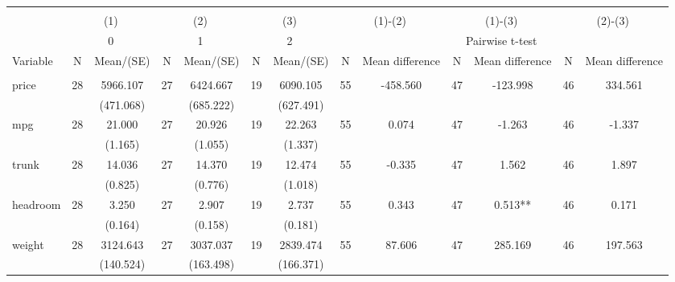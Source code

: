 
\begin{tabular}{@{\extracolsep{5pt}}lcccccccccccc}
\\[-1.8ex]\hline \hline \\[-1.8ex]
 & \multicolumn{2}{c}{(1)}  & \multicolumn{2}{c}{(2)}  & \multicolumn{2}{c}{(3)}  & \multicolumn{2}{c}{(1)-(2)} & \multicolumn{2}{c}{(1)-(3)} & \multicolumn{2}{c}{(2)-(3)} \\
 & \multicolumn{2}{c}{0}  & \multicolumn{2}{c}{1}  & \multicolumn{2}{c}{2}  & \multicolumn{6}{c}{Pairwise t-test}  \\
Variable & N & Mean/(SE) & N & Mean/(SE) & N & Mean/(SE) & N & Mean difference & N & Mean difference & N & Mean difference \\ \hline \\[-1.8ex] 
price   & 28    & 5966.107    & 27    & 6424.667    & 19    & 6090.105    & 55    & -458.560    & 47    & -123.998    & 46    & 334.561   \\
 &   & (471.068)  &   & (685.222)  &   & (627.491)  &   &  &   &  &   &  \\ [1ex]
mpg   & 28    & 21.000    & 27    & 20.926    & 19    & 22.263    & 55    & 0.074    & 47    & -1.263    & 46    & -1.337   \\
 &   & (1.165)  &   & (1.055)  &   & (1.337)  &   &  &   &  &   &  \\ [1ex]
trunk   & 28    & 14.036    & 27    & 14.370    & 19    & 12.474    & 55    & -0.335    & 47    & 1.562    & 46    & 1.897   \\
 &   & (0.825)  &   & (0.776)  &   & (1.018)  &   &  &   &  &   &  \\ [1ex]
headroom   & 28    & 3.250    & 27    & 2.907    & 19    & 2.737    & 55    & 0.343    & 47    & 0.513**    & 46    & 0.171   \\
 &   & (0.164)  &   & (0.158)  &   & (0.181)  &   &  &   &  &   &  \\ [1ex]
weight   & 28    & 3124.643    & 27    & 3037.037    & 19    & 2839.474    & 55    & 87.606    & 47    & 285.169    & 46    & 197.563   \\
 &   & (140.524)  &   & (163.498)  &   & (166.371)  &   &  &   &  &   &  \\ [1ex]

\end{tabular}
